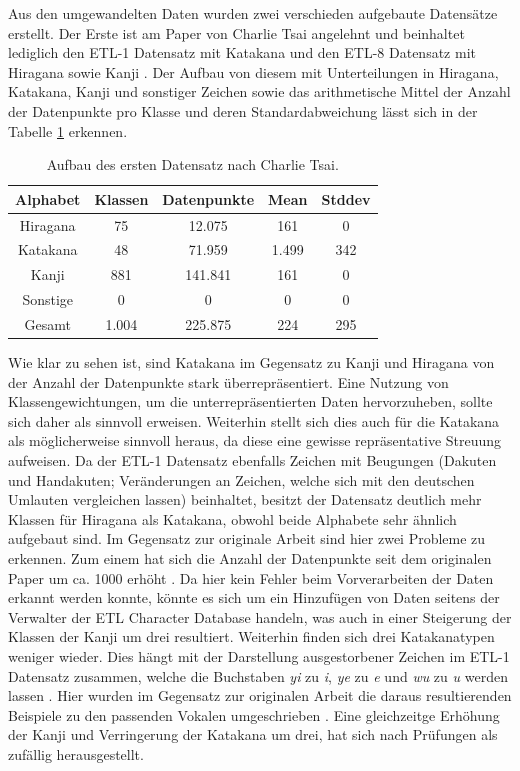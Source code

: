 \documentclass[twoside,a4paper]{IEEEtran}
\begin{document}
Aus den umgewandelten Daten wurden zwei verschieden aufgebaute Datensätze erstellt. Der Erste ist am Paper von Charlie Tsai angelehnt und beinhaltet lediglich den ETL-1 Datensatz mit Katakana und den ETL-8 Datensatz mit Hiragana sowie Kanji \cite[S.3]{RHC}. Der Aufbau von diesem mit Unterteilungen in Hiragana, Katakana, Kanji und sonstiger Zeichen sowie das arithmetische Mittel der Anzahl der Datenpunkte pro Klasse und deren Standardabweichung lässt sich in der Tabelle \ref{data_tsai} erkennen.
\begin{table}[!htb]
	\caption{Aufbau des ersten Datensatz nach Charlie Tsai.}
	\label{data_tsai}
	\centering
	\begin{tabular}{|c|c|c|c|c|}
		\hline
		Alphabet & Klassen & Datenpunkte & Mean & Stddev\\
		\hline
		\hline
		Hiragana & 75 & 12.075 & 161 & 0\\
		\hline 
		Katakana & 48 & 71.959 & 1.499 & 342\\
		\hline
		Kanji & 881 & 141.841 & 161 & 0\\
		\hline
		Sonstige & 0 & 0 & 0 & 0\\
		\hline
		\hline
		Gesamt & 1.004 & 225.875 & 224 & 295\\
		\hline
	\end{tabular}
\end{table}

Wie klar zu sehen ist, sind Katakana im Gegensatz zu Kanji und Hiragana von der Anzahl der Datenpunkte stark überrepräsentiert. Eine Nutzung von Klassengewichtungen, um die unterrepräsentierten Daten hervorzuheben, sollte sich daher als sinnvoll erweisen. Weiterhin stellt sich dies auch für die Katakana als möglicherweise sinnvoll heraus, da diese eine gewisse repräsentative Streuung aufweisen. Da der ETL-1 Datensatz ebenfalls Zeichen mit Beugungen (Da\-ku\-ten und Han\-da\-ku\-ten; Veränderungen an Zeichen, welche sich mit den deutschen Umlauten vergleichen lassen) beinhaltet, besitzt der Datensatz deutlich mehr Klassen für Hiragana als Katakana, obwohl beide Alphabete sehr ähnlich aufgebaut sind. Im Gegensatz zur originale Arbeit sind hier zwei Probleme zu erkennen. Zum einem hat sich die Anzahl der Datenpunkte seit dem originalen Paper um ca. 1000 erhöht \cite[S.3]{RHC}. Da hier kein Fehler beim Vorverarbeiten der Daten erkannt werden konnte, könnte es sich um ein Hinzufügen von Daten seitens der Verwalter der ETL Character Database handeln, was auch in einer Steigerung der Klassen der Kanji um drei resultiert. Weiterhin finden sich drei Katakanatypen weniger wieder. Dies hängt mit der Darstellung ausgestorbener Zeichen im ETL-1 Datensatz zusammen, welche die Buchstaben \textit{yi} zu \textit{i}, \textit{ye} zu \textit{e} und \textit{wu} zu \textit{u} werden lassen \cite{ETL}. Hier wurden im Gegensatz zur originalen Arbeit die daraus resultierenden Beispiele zu den passenden Vokalen umgeschrieben \cite[S.3]{RHC}. Eine gleichzeitge Erhöhung der Kanji und Verringerung der Katakana um drei, hat sich nach Prüfungen als zufällig herausgestellt. 
\end{document}
